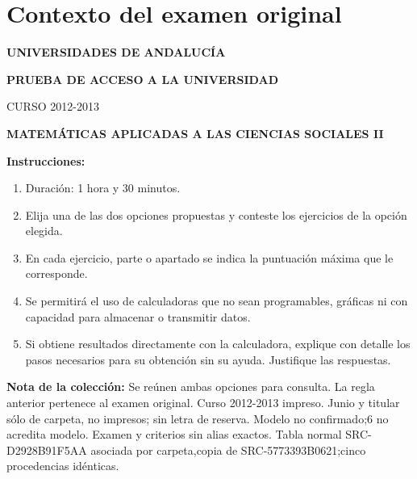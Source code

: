 \section*{Contexto del examen original}
\textbf{UNIVERSIDADES DE ANDALUCÍA}\par
\textbf{PRUEBA DE ACCESO A LA UNIVERSIDAD}\par
CURSO 2012-2013\par
\textbf{MATEMÁTICAS APLICADAS A LAS CIENCIAS SOCIALES II}

\textbf{Instrucciones:}
\begin{enumerate}[label=\textbf{\alph*)}]
  \item Duración: 1 hora y 30 minutos.
  \item Elija una de las dos opciones propuestas y conteste los ejercicios de la opción elegida.
  \item En cada ejercicio, parte o apartado se indica la puntuación máxima que le corresponde.
  \item Se permitirá el uso de calculadoras que no sean programables, gráficas ni con capacidad para almacenar o transmitir datos.
  \item Si obtiene resultados directamente con la calculadora, explique con detalle los pasos necesarios para su obtención sin su ayuda. Justifique las respuestas.
\end{enumerate}
\noindent\textbf{Nota de la colección:} Se reúnen ambas opciones para consulta. La regla anterior pertenece al examen original. Curso 2012-2013 impreso. Junio y titular sólo de carpeta, no impresos; sin letra de reserva. Modelo no confirmado;6 no acredita modelo. Examen y criterios sin alias exactos. Tabla normal SRC-D2928B91F5AA asociada por carpeta,copia de SRC-5773393B0621;cinco procedencias idénticas.
\par\medskip
